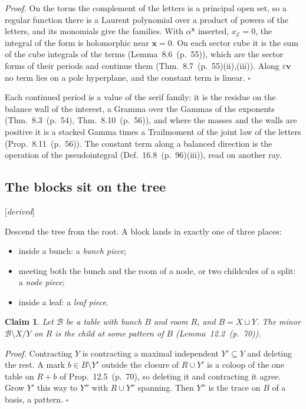 \documentclass[11pt]{article}
\newcommand{\cE}{\mathcal E}
\newcommand{\cB}{\mathcal B}
\newcommand{\status}[1]{\hfill{\small[\textit{#1}]}}
\newcommand{\hb}[2]{#1~(p.~#2)}   %
\theoremstyle{plain}
\newtheorem{claim}{Claim}[section]
\theoremstyle{remark}
\begin{document}
\emph{Proof.} On the torus the complement of the letters is a principal open set, so a regular function there is a Laurent polynomial over a product of powers of the letters, and its monomials give the families. With $\alpha^{\mathbf x}$ inserted, $x_{\cE}=0$, the integral of the form is holomorphic near $\mathbf x=0$. On each sector cube it is the sum of the cube integrals of the terms (Lemma~\hb{8.6}{55}), which are the sector forms of their periods and continue them (Thm.~\hb{8.7}{55}(ii),(iii)). Along $\varepsilon\mathbf v$ no term lies on a pole hyperplane, and the constant term is linear. $\square$

Each continued period is a value of the serif family: it is the residue on the balance wall of the interest, a Gramma over the Gammas of the exponents (Thm.~\hb{8.3}{54}, Thm.~\hb{8.10}{56}), and where the masses and the walls are positive it is a stacked Gamma times a Trailmoment of the joint law of the letters (Prop.~\hb{8.11}{56}). The constant term along a balanced direction is the operation of the pseudointegral (Def.~\hb{16.8}{96}(iii)), read on another ray.

\subsection{The blocks sit on the tree}\status{derived}

Descend the tree from the root. A block lands in exactly one of three places:
\begin{itemize}
\item inside a bunch: a \emph{bunch piece};
\item meeting both the bunch and the room of a node, or two childcules of a split: a \emph{node piece};
\item inside a leaf: a \emph{leaf piece}.
\end{itemize}

\begin{claim}\label{cl:children14}
Let $\cB$ be a table with bunch $B$ and room $R$, and $B=X\sqcup Y$. The minor $\cB\setminus X/Y$ on $R$ is the child at some pattern of $B$ (Lemma~\hb{12.2}{70}).
\end{claim}

\emph{Proof.} Contracting $Y$ is contracting a maximal independent $Y'\subseteq Y$ and deleting the rest. A mark $b\in B\setminus Y'$ outside the closure of $R\cup Y'$ is a coloop of the one table on $R+b$ of Prop.~\hb{12.5}{70}, so deleting it and contracting it agree. Grow $Y'$ this way to $Y''$ with $R\cup Y''$ spanning. Then $Y''$ is the trace on $B$ of a basis, a pattern. $\square$
\end{document}
